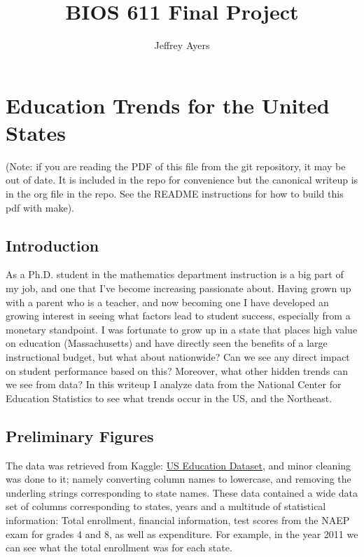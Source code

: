 \documentclass[
]{article}
\title{BIOS 611 Final Project}
\author{Jeffrey Ayers}
\begin{document}
\maketitle
\section{Education Trends for the United States}
\label{sec:org5437eb3}
(Note: if you are reading the PDF of this file from the git
repository, it may be out of date. It is included in the repo for
convenience but the canonical writeup is in the org file in the repo. See the README instructions for how to build this pdf with make).
\hypertarget{report}{%
\subsection{Introduction}\label{report}}

As a Ph.D. student in the mathematics department instruction is a big part of my job, and one that I've become increasing passionate about. Having grown up with a parent who is a teacher, and now becoming one I have developed an growing interest in seeing what factors lead to student success, especially from a monetary standpoint. I was fortunate to grow up in a state that places high value on education (Massachusetts) and have directly seen the benefits of a large instructional budget, but what about nationwide? Can we see any direct impact on student performance based on this? Moreover, what other hidden trends can we see from data? In this writeup I analyze data from the National Center for Education Statistics to see what trends occur in the US, and the Northeast.

\subsection{Preliminary Figures} 
The data was retrieved from Kaggle: \href{https://www.kaggle.com/datasets/noriuk/us-education-datasets-unification-project}{US Education Dataset}, and minor cleaning was done to it; namely converting column names to lowercase, and removing the underling strings corresponding to state names. These data contained a wide data set of columns corresponding to states, years and a multitude of statistical information: Total enrollment, financial information, test scores from the NAEP exam for grades 4 and 8, as well as expenditure. For example, in the year 2011 we can see what the total enrollment was for each state.
\end{document}
